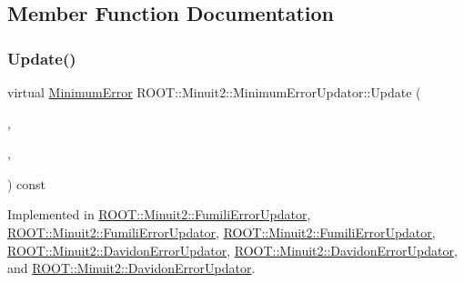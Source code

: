 \subsection{Member Function Documentation}
\mbox{\label{classROOT_1_1Minuit2_1_1MinimumErrorUpdator_ae75c33152c49ebf34e6119adc0bbbda9}} 
\subsubsection{\texorpdfstring{Update()}{Update()}\hspace{0.1cm}{\footnotesize\ttfamily [1/3]}}
{\footnotesize\ttfamily virtual \mbox{\hyperlink{classROOT_1_1Minuit2_1_1MinimumError}{Minimum\+Error}} R\+O\+O\+T\+::\+Minuit2\+::\+Minimum\+Error\+Updator\+::\+Update (\begin{DoxyParamCaption}\item[{const \mbox{\hyperlink{classROOT_1_1Minuit2_1_1MinimumState}{Minimum\+State}} \&}]{,  }\item[{const \mbox{\hyperlink{classROOT_1_1Minuit2_1_1MinimumParameters}{Minimum\+Parameters}} \&}]{,  }\item[{const \mbox{\hyperlink{classROOT_1_1Minuit2_1_1FunctionGradient}{Function\+Gradient}} \&}]{ }\end{DoxyParamCaption}) const\hspace{0.3cm}{\ttfamily [pure virtual]}}



Implemented in \mbox{\hyperlink{classROOT_1_1Minuit2_1_1FumiliErrorUpdator_ae5ee7f2052c474169dd19ffbc3755bd3}{R\+O\+O\+T\+::\+Minuit2\+::\+Fumili\+Error\+Updator}}, \mbox{\hyperlink{classROOT_1_1Minuit2_1_1FumiliErrorUpdator_a7a634a18816d8cdc6db8d92b27b69095}{R\+O\+O\+T\+::\+Minuit2\+::\+Fumili\+Error\+Updator}}, \mbox{\hyperlink{classROOT_1_1Minuit2_1_1FumiliErrorUpdator_a7a634a18816d8cdc6db8d92b27b69095}{R\+O\+O\+T\+::\+Minuit2\+::\+Fumili\+Error\+Updator}}, \mbox{\hyperlink{classROOT_1_1Minuit2_1_1DavidonErrorUpdator_afad671aa523cbd9f17af376c51c3ce97}{R\+O\+O\+T\+::\+Minuit2\+::\+Davidon\+Error\+Updator}}, \mbox{\hyperlink{classROOT_1_1Minuit2_1_1DavidonErrorUpdator_aae088602f78dc3bee91f7ce2534311e9}{R\+O\+O\+T\+::\+Minuit2\+::\+Davidon\+Error\+Updator}}, and \mbox{\hyperlink{classROOT_1_1Minuit2_1_1DavidonErrorUpdator_aae088602f78dc3bee91f7ce2534311e9}{R\+O\+O\+T\+::\+Minuit2\+::\+Davidon\+Error\+Updator}}.

